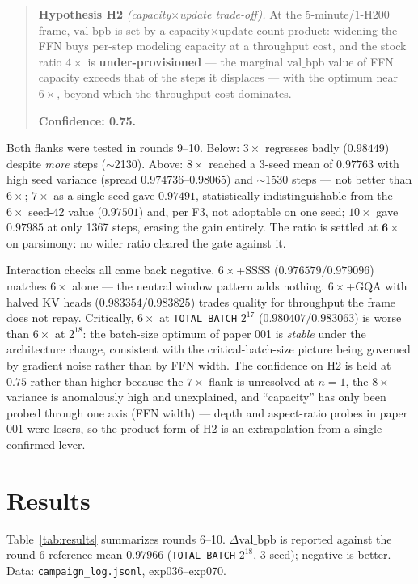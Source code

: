 \documentclass{article}
\newcommand{\valbpb}{\mathrm{val\_bpb}}
\begin{document}
\begin{quote}
\textbf{Hypothesis H2} \emph{(capacity$\times$update trade-off).} At the 5-minute/1-H200 frame, $\valbpb$ is set by a capacity$\times$update-count product: widening the FFN buys per-step modeling capacity at a throughput cost, and the stock ratio $4\times$ is \textbf{under-provisioned} --- the marginal $\valbpb$ value of FFN capacity exceeds that of the steps it displaces --- with the optimum near $6\times$, beyond which the throughput cost dominates.

\textbf{Confidence: 0.75.}
\end{quote}

Both flanks were tested in rounds 9--10. Below: $3\times$ regresses badly ($0.98449$) despite \emph{more} steps ($\sim$2130). Above: $8\times$ reached a 3-seed mean of $0.97763$ with high seed variance (spread $0.974736$--$0.98065$) and $\sim$1530 steps --- not better than $6\times$; $7\times$ as a single seed gave $0.97491$, statistically indistinguishable from the $6\times$ seed-42 value ($0.97501$) and, per F3, not adoptable on one seed; $10\times$ gave $0.97985$ at only 1367 steps, erasing the gain entirely. The ratio is settled at $\mathbf{6\times}$ on parsimony: no wider ratio cleared the gate against it.

Interaction checks all came back negative. $6\times$+SSSS ($0.976579 / 0.979096$) matches $6\times$ alone --- the neutral window pattern adds nothing. $6\times$+GQA with halved KV heads ($0.983354 / 0.983825$) trades quality for throughput the frame does not repay. Critically, $6\times$ at \texttt{TOTAL\_BATCH} $2^{17}$ ($0.980407 / 0.983063$) is worse than $6\times$ at $2^{18}$: the batch-size optimum of paper 001 is \emph{stable} under the architecture change, consistent with the critical-batch-size picture \cite{mccandlish2018empirical} being governed by gradient noise rather than by FFN width. The confidence on H2 is held at $0.75$ rather than higher because the $7\times$ flank is unresolved at $n{=}1$, the $8\times$ variance is anomalously high and unexplained, and ``capacity'' has only been probed through one axis (FFN width) --- depth and aspect-ratio probes in paper 001 were losers, so the product form of H2 is an extrapolation from a single confirmed lever.

\section{Results}
\label{sec:results}

Table~\ref{tab:results} summarizes rounds 6--10. $\Delta\valbpb$ is reported against the round-6 reference mean $0.97966$ (\texttt{TOTAL\_BATCH} $2^{18}$, 3-seed); negative is better. Data: \texttt{campaign\_log.jsonl}, exp036--exp070.
\end{document}
